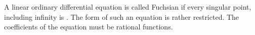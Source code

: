 \documentclass[12pt]{article}
\begin{document}
A linear ordinary differential equation is called Fuchsian if every singular point, including infinity is .  The form of such an equation is rather restricted.  The coefficients of the equation must be rational functions.
\end{document}
